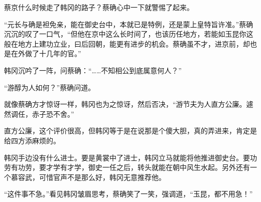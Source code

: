 蔡京什么时候走了韩冈的路子？蔡确心中一下就警惕了起来。

“元长与确是袒免亲，能在御史台中，本就已是特例，还是蒙上皇特旨许准。”蔡确沉沉的叹了一口气，“但他在京中这么长时间了，也该历任地方，若能如玉昆你这般在地方上建功立业，曰后回朝，能更有进步的机会。蔡确虽不才，进京前，却也是在外做了十几年的官。”

韩冈沉吟了一阵，问蔡确：“……不知相公到底属意何人？”

“游醇为人如何？”蔡确问道。

就像蔡确方才惊讶一样，韩冈也为之惊讶，然后否决，“游节夫为人直方公廉。遽然调任，赤子恐不舍。”

直方公廉，这个评价很高，但韩冈等于是在说那是个傻大胆，真的弄进来，肯定是给四方添麻烦的。

韩冈手边没有什么进士。要是黄裳中了进士，韩冈立马就能将他推进御史台。要功劳有功劳，要才学有才学，御史一任之后，转头就能在朝中风生水起。另外还有一个慕容武，可惜官声不是那么好，韩冈无意推荐他。

“这件事不急。”看见韩冈皱眉思考，蔡确笑了一笑，强调道，“玉昆，都不用急！”

